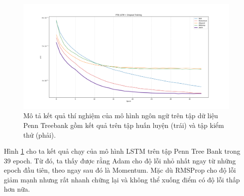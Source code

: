 \begin{figure}[htp]
	\centering
	\includegraphics[width=140 mm]{images/ptb.png}
	\caption{Mô tả kết quả thí nghiệm của mô hình ngôn ngữ trên tập dữ liệu Penn Treebank gồm kết quả trên tập huấn luyện (trái) và tập kiểm thử (phải).}
	\label{fig:ptb}
\end{figure}

Hình \ref{fig:ptb} cho ta kết quả chạy của mô hình LSTM trên tập Penn Tree Bank trong 39 epoch. Từ đó, ta thấy được rằng Adam cho độ lỗi nhỏ nhất ngay từ những epoch đầu tiên, theo ngay sau đó là Momentum. Mặc dù RMSProp cho độ lỗi giảm mạnh nhưng rất nhanh chững lại và không thể xuống điểm có độ lỗi thấp hơn nữa.

